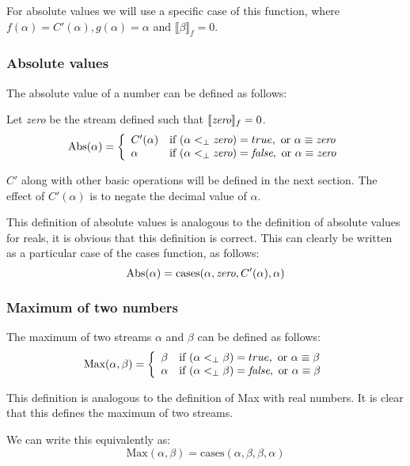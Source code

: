 \documentclass{cs4rep}
\begin{document}
For absolute values we will use a specific case of this function,
where $f(\alpha)=C'(\alpha), g(\alpha) = \alpha$ and $\llbracket \beta
\rrbracket_{f} = 0$.


\subsubsection*{Absolute values}
The absolute value of a number can be defined as follows:

Let {\em zero} be the stream defined such that $\llbracket \mbox{{\em zero}} \rrbracket_{f} = 0$.
\[ \mbox{Abs}(\alpha) = \left\{ 
\begin{array}{ll}
C'(\alpha) & \mbox{if } (\alpha <_{\perp} \mbox{{\em zero}}) = true, \mbox{ or } \alpha \equiv \mbox{{\em zero}} \\
\alpha & \mbox{if } (\alpha <_{\perp} \mbox{{\em zero}}) =  \mbox{{\em false}}, \mbox{ or } \alpha \equiv \mbox{{\em zero}}
\end{array}
\right. \]

$C'$ along with other basic operations will be defined in the next
section. The effect of $C'(\alpha)$ is to negate the
decimal value of $\alpha$.

This definition of absolute values is analogous to the definition of
absolute values for reals, it is obvious that this definition is correct.
This can clearly be written as a particular case of the cases
function, as follows:
\[ \mbox{Abs}(\alpha) = \mbox{cases}(\alpha,\mbox{{\em zero}},C'(\alpha),\alpha) \]

\subsubsection*{Maximum of two numbers}
The maximum of two streams $\alpha$ and $\beta$ can be defined as follows:
\[ \mbox{Max}(\alpha,\beta) = \left\{ 
\begin{array}{ll}
\beta & \mbox{if } (\alpha <_{\perp} \beta) = true, \mbox{ or } \alpha \equiv \beta \\
\alpha & \mbox{if } (\alpha <_{\perp} \beta)  =  \mbox{{\em false}}, \mbox{ or } \alpha \equiv \beta
\end{array}
\right. \]

This definition is analogous to the definition of Max with real
numbers. It is clear that this defines the maximum of two streams.

We can write this equivalently as:
\[ \mbox{Max}(\alpha,\beta) = \mbox{cases}(\alpha,\beta,\beta,\alpha) \]
\end{document}
